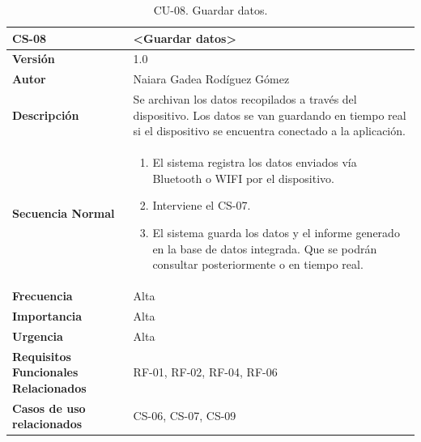 \begin{table}[h!]
\centering
\begin{tabular}{ |m{3cm}|m{11cm}|  } 
\hline
\cellcolor[HTML]{B9E3F0}\textbf{CS-08} & \cellcolor[HTML]{B9E3F0}\textbf{<Guardar datos>}\\

\hline
\cellcolor[HTML]{EFEFEF}\textbf{Versión}             & 1.0  \\
\hline
\cellcolor[HTML]{EFEFEF}\textbf{Autor}                & Naiara Gadea Rodíguez Gómez\\
\hline
\cellcolor[HTML]{EFEFEF}\textbf{Descripción}                & {Se archivan los datos recopilados a través del dispositivo. Los datos se van guardando en tiempo real si el dispositivo se encuentra conectado a la aplicación.}\\
\hline
\cellcolor[HTML]{EFEFEF}\textbf{Secuencia \newline Normal}                &                 
        \begin{enumerate}
			\def\labelenumi{\arabic{enumi}.}
			\tightlist
			\item El sistema registra los datos enviados vía Bluetooth o WIFI por el dispositivo.
			\item Interviene el CS-07.
                \item El sistema guarda los datos y el informe generado en la base de datos integrada. Que se podrán consultar posteriormente o en tiempo real.
		\end{enumerate}\\
\hline
\cellcolor[HTML]{EFEFEF}\textbf{Frecuencia}                & Alta\\
\hline
\cellcolor[HTML]{EFEFEF}\textbf{Importancia}                & Alta\\
\hline
\cellcolor[HTML]{EFEFEF}\textbf{Urgencia}                & Alta\\
\hline
\cellcolor[HTML]{EFEFEF}\textbf{Requisitos Funcionales Relacionados}                & {RF-01, RF-02, RF-04, RF-06} \\
\hline
\cellcolor[HTML]{EFEFEF}\textbf{Casos de uso relacionados}                & {CS-06, CS-07, CS-09}\\
\hline
\end{tabular}
\caption{CU-08. Guardar datos.}
\end{table}

